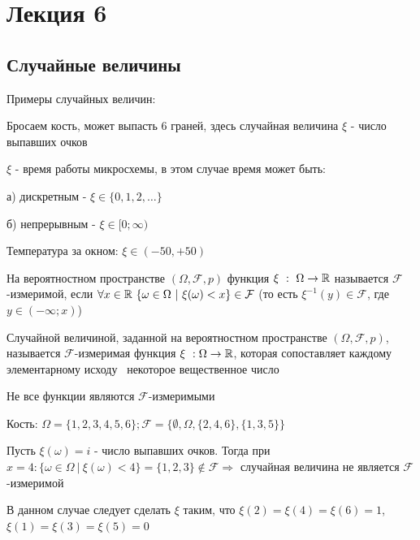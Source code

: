 \documentclass[12pt]{article}
\begin{document}

    \section{Лекция 6}

    \subsection{Случайные величины}

    Примеры случайных величин:

     Бросаем кость, может выпасть 6 граней, здесь случайная величина $\xi$ - число выпавших очков

     $\xi$ - время работы микросхемы, в этом случае время может быть:

    а) дискретным - $\xi \in \{0, 1, 2, \dots\}$

    б) непрерывным - $\xi \in [0; \infty)$

     Температура за окном: $\xi \in (-50, +50)$

    \hypertarget{measurabilityoffunction}{}

    \Def На вероятностном пространстве $(\Omega, \mathcal{F}, p)$ функция $\xi \ : \ \Omega \to \mathbb{R}$ называется
    $\mathcal{F}$-измеримой, если $\forall x \in \mathbb{R} \ \{\omega \in \Omega \ | \ \xi(\omega) < x\} \in \mathcal{F}$
    (то есть $\xi^{-1}(y) \in \mathcal{F}$, где $y \in (-\infty; x)$)

    \hypertarget{randomvaluedefinition}{}

    \Def Случайной величиной, заданной на вероятностном пространстве $(\Omega, \mathcal{F}, p)$, называется
    $\mathcal{F}$-измеримая функция $\xi \ : \Omega \to \mathbb{R}$, которая сопоставляет каждому элементарному исходу \
    некоторое вещественное число

    \Nota Не все функции являются $\mathcal{F}$-измеримыми

    \Exs Кость: $\Omega = \{1, 2, 3, 4, 5, 6\}; \mathcal{F} = \{\emptyset, \Omega, \{2, 4, 6\}, \{1, 3, 5\}\}$

    Пусть $\xi(\omega) = i$ - число выпавших очков. Тогда при $x = 4: \{\omega \in \Omega \ | \ \xi (\omega) < 4\} = \{1, 2, 3\} \notin \mathcal{F} \Longrightarrow$ случайная величина не является $\mathcal{F}$-измеримой

    В данном случае следует сделать $\xi$ таким, что $\xi(2) = \xi(4) = \xi(6) = 1$, $\xi(1) = \xi(3) = \xi(5) = 0$
\end{document}

